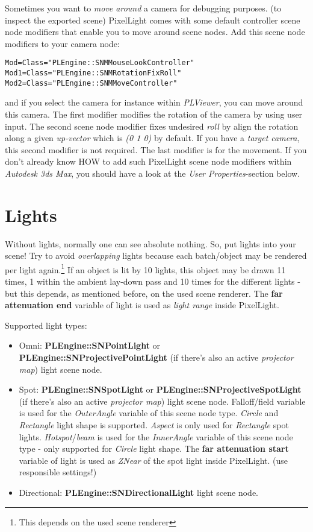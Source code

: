 Sometimes you want to \emph{move around} a camera for debugging purposes. (to inspect the exported scene) PixelLight comes with some default controller scene node modifiers that enable you to move around scene nodes. Add this scene node modifiers to your camera node:

\begin{lstlisting}[caption=Free camera scene node modifiers]
Mod=Class="PLEngine::SNMMouseLookController"
Mod1=Class="PLEngine::SNMRotationFixRoll"
Mod2=Class="PLEngine::SNMMoveController"
\end{lstlisting}

and if you select the camera for instance within \emph{PLViewer}, you can move around this camera. The first modifier modifies the rotation of the camera by using user input. The second scene node modifier fixes undesired \emph{roll} by align the rotation along a given \emph{up-vector} which is \emph{(0 1 0)} by default. If you have a \emph{target camera}, this second modifier is not required. The last modifier is for the movement. If you don't already know HOW to add such PixelLight scene node modifiers within \emph{Autodesk 3ds Max}, you should have a look at the \emph{User Properties}-section below.




\section{Lights}
Without lights, normally one can see absolute nothing. So, put lights into your scene! Try to avoid \emph{overlapping} lights because each batch/object may be rendered per light again.\footnote{This depends on the used scene renderer} If an object is lit by 10 lights, this object may be drawn 11 times, 1 within the ambient lay-down pass and 10 times for the different lights - but this depends, as mentioned before, on the used scene renderer. The \textbf{far attenuation end} variable of light is used as \emph{light range} inside PixelLight.

Supported light types:
\begin{itemize}
\item{Omni: \textbf{PLEngine::SNPointLight} or \textbf{PLEngine::SNProjectivePointLight} (if there's also an active \emph{projector map}) light scene node.}
\item{Spot: \textbf{PLEngine::SNSpotLight} or \textbf{PLEngine::SNProjectiveSpotLight} (if there's also an active \emph{projector map}) light scene node. Falloff/field variable is used for the \emph{OuterAngle} variable of this scene node type. \emph{Circle} and \emph{Rectangle} light shape is supported. \emph{Aspect} is only used for \emph{Rectangle} spot lights. \emph{Hotspot}/\emph{beam} is used for the \emph{InnerAngle} variable of this scene node type - only supported for \emph{Circle} light shape. The \textbf{far attenuation start} variable of light is used as \emph{ZNear} of the spot light inside PixelLight. (use responsible settings!)}
\item{Directional: \textbf{PLEngine::SNDirectionalLight} light scene node.}
\end{itemize}

